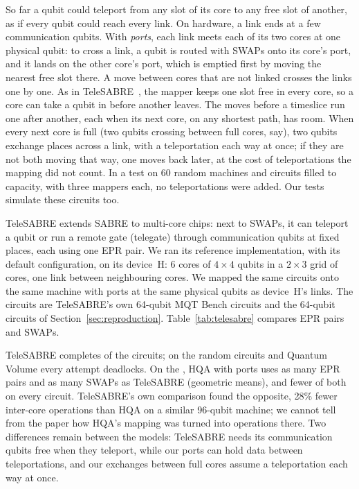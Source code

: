 \documentclass[11pt]{article}
\begin{document}
So far a qubit could teleport from any slot of its core to any free slot of
another, as if every qubit could reach every link. On hardware, a link ends
at a few communication qubits. With \emph{ports}, each link meets each of its
two cores at one physical qubit: to cross a link, a qubit is routed with
SWAPs onto its core's port, and it lands on the other core's port, which is
emptied first by moving the nearest free slot there. A move between cores
that are not linked crosses the links one by one. As in
TeleSABRE~\cite{russo2025telesabre}, the mapper keeps one slot free in every
core, so a core can take a qubit in before another leaves. The moves before a
timeslice run one after another, each when its next core, on any shortest
path, has room. When every next core is full (two qubits crossing between
full cores, say), two qubits exchange places across a link, with a
teleportation each way at once; if they are not both moving that way, one
moves back later, at the cost of teleportations the mapping did not count.
In a test on 60 random machines and circuits filled to capacity, with three
mappers each, no teleportations were added. Our tests simulate these
circuits too.

TeleSABRE extends SABRE to multi-core chips: next to SWAPs, it can teleport a
qubit or run a remote gate (telegate) through communication qubits at fixed
places, each using one EPR pair. We ran its reference implementation, with
its default configuration, on its device~H: 6 cores of $4\times4$ qubits in a
$2\times3$ grid of cores, one link between neighbouring cores. We mapped the
same circuits onto the same machine with ports at the same physical qubits
as device~H's links. The circuits are TeleSABRE's own 64-qubit MQT Bench
circuits and the 64-qubit circuits of Section~\ref{sec:reproduction}.
Table~\ref{tab:telesabre} compares EPR pairs and SWAPs.

\begin{table}[t]
\centering
\small

\caption{EPR pairs / SWAPs on TeleSABRE's device~H (teleportations plus
telegates for TeleSABRE). Our mappers route through ports at device~H's
communication qubits; the last column is HQA with abstract communication
(EPR pairs only). $^*$: TeleSABRE's MQT Bench circuits. ``fails'': every one
of TeleSABRE's 100 attempts deadlocked.}
\label{tab:telesabre}
\end{table}

TeleSABRE completes \telesabreCompleted{} of the \telesabreCircuits{} circuits;
on the random circuits and Quantum Volume every attempt deadlocks. On the
\telesabreCompleted{}, HQA with ports uses \telesabreEprRatio{} as many EPR
pairs and \telesabreSwapRatio{} as many SWAPs as TeleSABRE (geometric means),
and fewer of both on every circuit. TeleSABRE's own comparison found the
opposite, 28\% fewer inter-core operations than HQA on a similar 96-qubit
machine; we cannot tell from the paper how HQA's mapping was turned into
operations there. Two differences remain between the models: TeleSABRE
needs its communication qubits free when they teleport, while our ports can
hold data between teleportations, and our exchanges between full cores
assume a teleportation each way at once.
\end{document}
